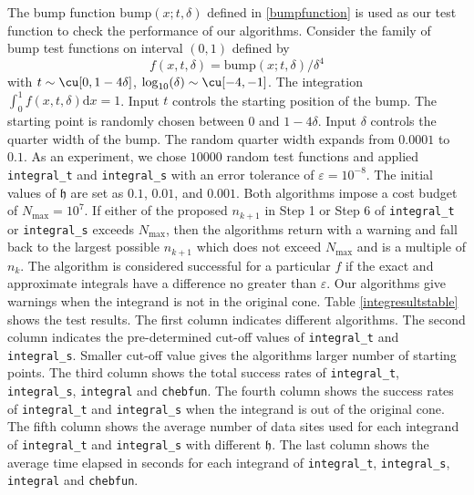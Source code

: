 \documentclass{iitthesis}
\DeclareMathOperator{\Var}{Var}
\theoremstyle{definition}
\theoremstyle{remark}
\begin{document}
The bump function $\text{bump}(x;t,\delta)$ defined in \eqref{bumpfunction} is used as our test function to check the performance of our algorithms. Consider the family of bump test functions on interval $(0,1)$ defined by
\begin{equation}\label{testfun}
f(x,t,\delta)= \text{bump}(x;t,\delta)/\delta^{4}
\end{equation}
with  $t \sim \cu[0,1-4\delta]$, $\log_{10}(\delta) \sim \cu[-4,-1]$. The integration $\int_{0}^{1}f(x,t,\delta)\text{d}x=1$. Input $t$ controls the starting position of the bump. The starting point is randomly chosen between $0$ and $1-4\delta$. Input $\delta$ controls the quarter width of the bump. The random quarter width expands from $0.0001$ to $0.1$.
As an experiment, we chose $10000$ random test functions and applied {\tt integral\_t} and {\tt integral\_s} with an error tolerance of  $\varepsilon = 10^{-8}$. The initial values of $\mathfrak{h}$ are set as $0.1$, $0.01$, and $0.001$. Both algorithms impose a cost budget of $N_{\max}=10^7$. If either of the proposed $n_{k+1}$ in Step 1 or Step 6 of {\tt integral\_t} or {\tt integral\_s} exceeds $N_{\max}$, then the algorithms return with a warning and fall back to the largest possible $n_{k+1}$ which does not exceed $N_{\max}$ and is a multiple of $n_{k}$.  The algorithm is considered successful for a particular $f$ if the exact and approximate integrals have a difference no greater than $\varepsilon$. Our algorithms give warnings when the integrand is not in the original cone. Table \ref{integresultstable} shows the test results. The first column indicates different algorithms. The second column indicates the pre-determined cut-off values of {\tt integral\_t} and {\tt integral\_s}. Smaller cut-off value gives the algorithms larger number of starting points. The third column shows the total success rates of {\tt integral\_t}, {\tt integral\_s}, {\tt integral} and {\tt chebfun}. The fourth column shows the success rates of {\tt integral\_t} and {\tt integral\_s} when the integrand is out of the original cone. The fifth column shows the average number of data sites used for each integrand of {\tt integral\_t} and {\tt integral\_s} with different $\mathfrak{h}$. The last column shows the average time elapsed in seconds for each integrand of {\tt integral\_t}, {\tt integral\_s}, {\tt integral} and {\tt chebfun}.  %
\end{document}
